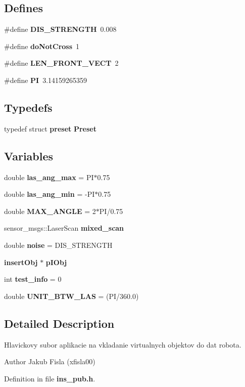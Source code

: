 \subsection*{Defines}
\begin{DoxyCompactItemize}
\item 
\#define {\bf DIS\_\-STRENGTH}~0.008
\item 
\#define {\bf doNotCross}~1
\item 
\#define {\bf LEN\_\-FRONT\_\-VECT}~2
\item 
\#define {\bf PI}~3.14159265359
\end{DoxyCompactItemize}
\subsection*{Typedefs}
\begin{DoxyCompactItemize}
\item 
typedef struct {\bf preset} {\bf Preset}
\end{DoxyCompactItemize}
\subsection*{Variables}
\begin{DoxyCompactItemize}
\item 
double {\bf las\_\-ang\_\-max} = PI$\ast$0.75
\item 
double {\bf las\_\-ang\_\-min} = -\/PI$\ast$0.75
\item 
double {\bf MAX\_\-ANGLE} = 2$\ast$PI/0.75
\item 
sensor\_\-msgs::LaserScan {\bf mixed\_\-scan}
\item 
double {\bf noise} = DIS\_\-STRENGTH
\item 
{\bf insertObj} $\ast$ {\bf pIObj}
\item 
int {\bf test\_\-info} = 0
\item 
double {\bf UNIT\_\-BTW\_\-LAS} = (PI/360.0)
\end{DoxyCompactItemize}


\subsection{Detailed Description}
Hlavickovy subor aplikacie na vkladanie virtualnych objektov do dat robota. \begin{DoxyAuthor}{Author}
Jakub Fisla (xfisla00) 
\end{DoxyAuthor}


Definition in file {\bf ins\_\-pub.h}.



